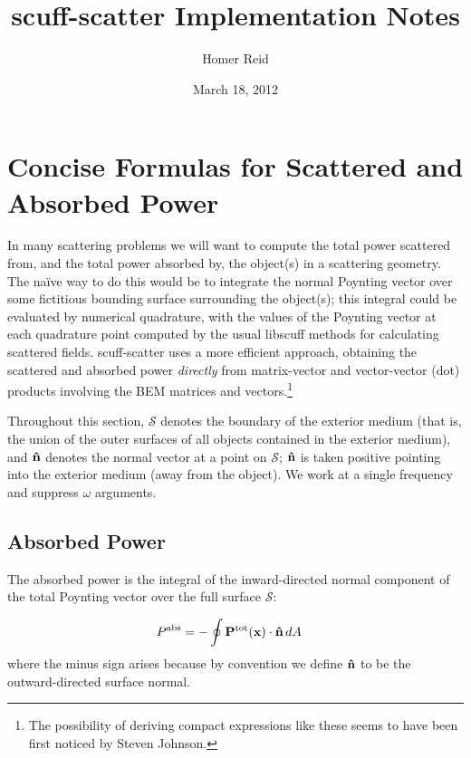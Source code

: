 \documentclass[letterpaper]{article}
\title {{\sc scuff-scatter} Implementation Notes}
\author {Homer Reid}
\date {March 18, 2012}
\begin{document}
\pagestyle{myheadings}
\maketitle

\tableofcontents

\newpage
\section{Concise Formulas for Scattered and Absorbed Power}

In many scattering problems we will want to compute the total
power scattered from, and the total power absorbed by, the
object(s) in a scattering geometry.  The na\"ive way to do 
this would be to integrate the normal Poynting vector over
some fictitious bounding surface surrounding the object(s);
this integral could be evaluated by numerical quadrature,
with the values of the Poynting vector at each quadrature
point computed by the usual {\sc libscuff} methods for
calculating scattered fields. {\sc scuff-scatter} uses a 
more efficient approach, obtaining the scattered and absorbed 
power \textit{directly} from matrix-vector and vector-vector 
(dot) products involving the BEM matrices and 
vectors.\footnote{The possibility of deriving compact 
expressions like these seems to have been first noticed by
Steven Johnson.}

Throughout this section, $\mathcal{S}$ denotes the boundary
of the exterior medium (that is, the union of the outer surfaces
of all objects contained in the exterior medium), and 
$\mathbf{\hat n}$ denotes the normal vector at a point on 
$\mathcal{S}$; $\mathbf{\hat n}$ is taken positive pointing
into the exterior medium (away from the object).
We work at a single frequency and suppress $\omega$ arguments.

\subsection{Absorbed Power}

The absorbed power is the integral of the inward-directed normal 
component of the total Poynting vector over the full surface
$\mathcal{S}$:

\begin{align}
 P^{\hbox{\scriptsize{abs}}} 
&= - \oint \mathbf{P}^{\hbox{\scriptsize{tot}}}(\mathbf{x}) \cdot \mathbf{\hat n} \, dA 
\label{AbsorbedPower}
\end{align}
where the minus sign arises because by convention we define $\mathbf{\hat n}$ 
to be the outward-directed surface normal.
\end{document}
